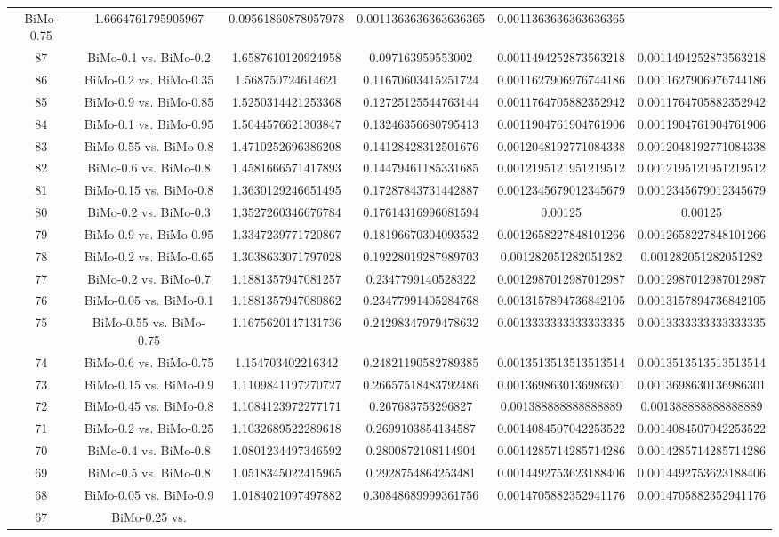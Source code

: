 \documentclass[a4paper,10pt]{article}
\begin{document}
\begin{landscape}
\begin{table}[!htp]
\begin{tabular}{cccccc}
BiMo-0.75&1.6664761795905967&0.09561860878057978&0.0011363636363636365&0.0011363636363636365\\87&BiMo-0.1 vs. BiMo-0.2&1.6587610120924958&0.097163959553002&0.0011494252873563218&0.0011494252873563218\\86&BiMo-0.2 vs. BiMo-0.35&1.568750724614621&0.11670603415251724&0.0011627906976744186&0.0011627906976744186\\85&BiMo-0.9 vs. BiMo-0.85&1.5250314421253368&0.12725125544763144&0.0011764705882352942&0.0011764705882352942\\84&BiMo-0.1 vs. BiMo-0.95&1.5044576621303847&0.13246356680795413&0.0011904761904761906&0.0011904761904761906\\83&BiMo-0.55 vs. BiMo-0.8&1.4710252696386208&0.14128428312501676&0.0012048192771084338&0.0012048192771084338\\82&BiMo-0.6 vs. BiMo-0.8&1.4581666571417893&0.14479461185331685&0.0012195121951219512&0.0012195121951219512\\81&BiMo-0.15 vs. BiMo-0.8&1.3630129246651495&0.17287843731442887&0.0012345679012345679&0.0012345679012345679\\80&BiMo-0.2 vs. BiMo-0.3&1.3527260346676784&0.17614316996081594&0.00125&0.00125\\79&BiMo-0.9 vs. BiMo-0.95&1.3347239771720867&0.18196670304093532&0.0012658227848101266&0.0012658227848101266\\78&BiMo-0.2 vs. BiMo-0.65&1.3038633071797028&0.19228019287989703&0.001282051282051282&0.001282051282051282\\77&BiMo-0.2 vs. BiMo-0.7&1.1881357947081257&0.2347799140528322&0.0012987012987012987&0.0012987012987012987\\76&BiMo-0.05 vs. BiMo-0.1&1.1881357947080862&0.23477991405284768&0.0013157894736842105&0.0013157894736842105\\75&BiMo-0.55 vs. BiMo-0.75&1.1675620147131736&0.24298347979478632&0.0013333333333333335&0.0013333333333333335\\74&BiMo-0.6 vs. BiMo-0.75&1.154703402216342&0.24821190582789385&0.0013513513513513514&0.0013513513513513514\\73&BiMo-0.15 vs. BiMo-0.9&1.1109841197270727&0.26657518483792486&0.0013698630136986301&0.0013698630136986301\\72&BiMo-0.45 vs. BiMo-0.8&1.1084123972277171&0.267683753296827&0.001388888888888889&0.001388888888888889\\71&BiMo-0.2 vs. BiMo-0.25&1.1032689522289618&0.2699103854134587&0.0014084507042253522&0.0014084507042253522\\70&BiMo-0.4 vs. BiMo-0.8&1.0801234497346592&0.2800872108114904&0.0014285714285714286&0.0014285714285714286\\69&BiMo-0.5 vs. BiMo-0.8&1.0518345022415965&0.2928754864253481&0.0014492753623188406&0.0014492753623188406\\68&BiMo-0.05 vs. BiMo-0.9&1.0184021097497882&0.30848689999361756&0.0014705882352941176&0.0014705882352941176\\67&BiMo-0.25 vs. 
\end{tabular}
\end{table}
\end{landscape}
\end{document}
